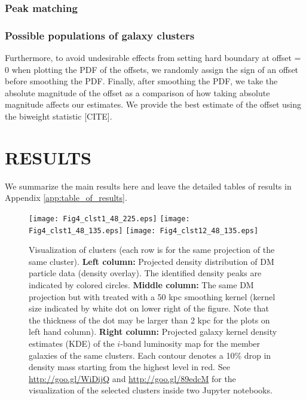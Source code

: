 \subsubsection{Peak matching}

\subsubsection{Possible populations of galaxy clusters}
Furthermore, to avoid undesirable effects from setting hard boundary at offset
= 0 when plotting the PDF of the offsets, we randomly assign the sign of an
offset before smoothing the PDF. Finally, after smoothing the PDF, we take the
absolute magnitude of the offset as a comparison of how taking absolute
magnitude affects our estimates. We provide the best estimate of the offset
using the biweight statistic [CITE].







\section{RESULTS} 
\label{sec:results}

We summarize the main results here and leave the detailed tables of results in 
Appendix \ref{app:table_of_results}.


\begin{figure*}
	\begin{center}
	\texttt{[image: Fig4\_clst1\_48\_225.eps]}
	\texttt{[image: Fig4\_clst1\_48\_135.eps]}
	\texttt{[image: Fig4\_clst12\_48\_135.eps]}
	\caption{ Visualization of clusters (each row is for the same projection
		of the same cluster). {\bf Left column:} Projected density distribution of DM	
		particle data (density overlay). 
		The identified density peaks are indicated by colored circles. 
		{\bf Middle column:} The same DM projection but with treated with a 50 
		kpc smoothing kernel (kernel size indicated by white dot on lower right of
		the figure. Note that the thickness of the dot may be larger than 2 kpc
		for the plots on left hand column).
		{\bf Right column:} Projected galaxy kernel density estimates (KDE) of 
		the $i$-band luminosity map for the member
		galaxies of the same clusters. Each contour denotes a 10\% drop in density
		mass starting from the highest level in red.
		See \href{http://goo.gl/WiDijQ}{http://goo.gl/WiDijQ} 
		and \href{http://goo.gl/89edcM}{http://goo.gl/89edcM} for the 
		visualization of the selected clusters inside two Jupyter notebooks.
		\label{fig:select_peak_visualization}
	}
\end{center}
\end{figure*}





